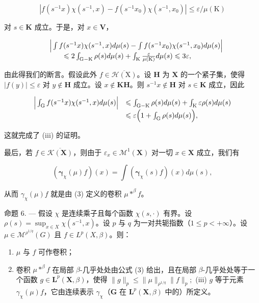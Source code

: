 \[
\left| f \left(s ^ {- 1} x\right) \chi \left(s ^ {- 1}, x\right) - f \left(s ^ {- 1} x _ {0}\right) \chi \left(s ^ {- 1}, x _ {0}\right) \right| \leqslant \varepsilon / \mu (\mathrm{K})
\]

对 \(s \in \mathbf{K}\) 成立。于是，对 \(x \in \mathbf{V}\)，

\[
\begin{array}{r l} & {\Big | \int f (s ^ {- 1} x) \chi (s ^ {- 1}, x) d \mu (s) - \int f (s ^ {- 1} x _ {0}) \chi (s ^ {- 1}, x _ {0}) d \mu (s) \Big |} \\ & {\qquad \leqslant 2 \int_ {\mathrm{G-K}} \rho (s) d \mu (s) + \int_ {\mathrm{K}} \frac {\varepsilon}{\mu (\mathrm{K})} d \mu (s) \leqslant 3 \varepsilon ,} \end{array}
\]

由此得我们的断言。假设此外 \(f \in \overline{\mathcal{H}(\mathrm{X})}\)。设 \(\mathbf{H}\) 为 \(\mathbf{X}\) 的一个紧子集，使得 \(|f(y)| \leqslant \varepsilon\) 对 \(y \notin \mathbf{H}\) 成立。设 \(x \notin \mathbf{KH}\)。则 \(s^{-1}x \notin \mathbf{H}\) 对 \(s \in \mathbf{K}\) 成立，因此

\[
\begin{array}{r l} \Big | \int_ {\mathrm{G}} f (s ^ {- 1} x) \chi (s ^ {- 1}, x) d \mu (s) \Big | & \leqslant \int_ {\mathrm{G} - \mathrm{K}} \rho (s) d \mu (s) + \int_ {\mathrm{K}} \varepsilon \rho (s) d \mu (s) \\ & \leqslant \varepsilon \Big (1 + \int_ {\mathrm{G}} \rho (s) d \mu (s) \Big), \end{array}
\]

这就完成了 (iii) 的证明。

最后，若 \(f \in \overline{\mathcal{K}(\mathbf{X})}\)，则由于 \(\varepsilon_x \in \mathcal{M}^1(\mathbf{X})\) 对一切 \(x \in \mathbf{X}\) 成立，我们有

\[
\left(\boldsymbol {\gamma} _ {\chi} (\mu) f\right) (x) = \int \left(\boldsymbol {\gamma} _ {\chi} (s) f\right) (x) d \mu (s),
\]

从而 \(\gamma_{\chi}(\mu)f\) 就是由 (3) 定义的卷积 \(\mu *^{\beta}f\)。

命题 6. --- 假设 \(\chi\) 是连续乘子且每个函数 \(\chi(s, \cdot)\) 有界。设 \(\rho(s) = \sup_{x \in X} \chi(s^{-1}, x)\)。设 \(p\) 与 \(q\) 为一对共轭指数（\(1 \leqslant p < +\infty\)）。设 \(\mu \in \mathcal{M}^{\rho^{1/q}}(G)\) 且 \(f \in L^{p}(X, \beta)\)。则：

\begin{enumerate}
\def\labelenumi{(\roman{enumi})}
\item
  \(\mu\) 与 \(f\) 可作卷积；
\item
  卷积 \(\mu * ^ {\beta} f\) 在局部 \(\beta\)-几乎处处由公式 (3) 给出，且在局部 \(\beta\)-几乎处处等于一个函数 \(g\in \mathbf{L}^p (\mathbf{X},\beta)\)，使得 \(\| g\| _p\leqslant \| \mu \|_{\rho^{1 / q}}\| f\| _p;\) (iii) \(g\) 等于元素 \(\gamma_{\chi}(\mu)f\)，它由连续表示 \(\gamma_{\chi}\)（\(\mathbf{G}\) 在 \(\mathbf{L}^p (\mathbf{X},\beta)\) 中的）所定义。
\end{enumerate}

